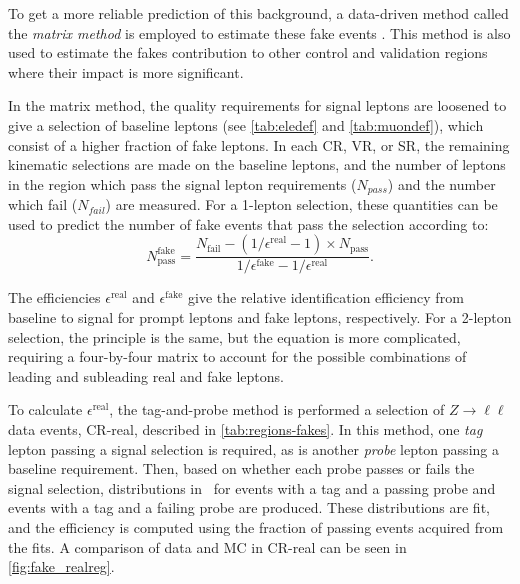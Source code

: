 To get a more reliable prediction of this background, a data-driven method called the \textit{matrix method} is employed to estimate these fake events \cite{SUSY-2013-20}. This method is also used to estimate the fakes contribution to other control and validation regions where their impact is more significant. 

In the matrix method, the quality requirements for signal leptons are loosened to give a selection of baseline leptons (see \autoref{tab:eledef} and \autoref{tab:muondef}), which consist of a higher fraction of fake leptons. In each \ac{CR}, \ac{VR}, or \ac{SR}, the remaining kinematic selections are made on the baseline leptons, and the number of leptons in the region which pass the signal lepton requirements ($N_{pass}$) and the number which fail ($N_{fail}$) are measured. For a 1-lepton selection, these quantities can be used to predict the number of fake events that pass the selection according to:
%
\begin{equation}
N_{\text{pass}}^{\text{fake}} = \frac{N_{\text{fail}} - (1/\epsilon^{\text{real}} - 1) \times N_{\text{pass}} }{1/\epsilon^{\text{fake}} - 1/\epsilon^{\text{real}}}.
\end{equation}

The efficiencies $\epsilon^\text{real}$ and $\epsilon^\text{fake}$ give the relative identification efficiency from baseline to signal for prompt leptons and fake leptons, respectively. For a 2-lepton selection, the principle is the same, but the equation is more complicated, requiring a four-by-four matrix to account for the possible combinations of leading and subleading real and fake leptons. 


To calculate $\epsilon^\text{real}$, the tag-and-probe method is performed a selection of $Z\rightarrow\ell\ell$ data events, CR-real, described in \autoref{tab:regions-fakes}. In this method, one \textit{tag} lepton passing a signal selection is required, as is another \textit{probe} lepton passing a baseline requirement. Then, based on whether each probe passes or fails the signal selection, distributions in \mll~for events with a tag and a passing probe and events with a tag and a failing probe are produced. These distributions are fit, and the efficiency is computed using the fraction of passing events acquired from the fits. A comparison of data and \ac{MC} in CR-real can be seen in \autoref{fig:fake_realreg}.
 
